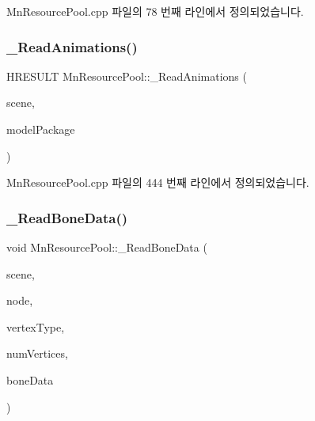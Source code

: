 Mn\+Resource\+Pool.\+cpp 파일의 78 번째 라인에서 정의되었습니다.

\mbox{\label{class_m_n_l_1_1_mn_resource_pool_a730bf312676520ba6b57f6d4a6dfdd6f}} 
\subsubsection{\texorpdfstring{\+\_\+\+Read\+Animations()}{\_ReadAnimations()}}
{\footnotesize\ttfamily H\+R\+E\+S\+U\+LT Mn\+Resource\+Pool\+::\+\_\+\+Read\+Animations (\begin{DoxyParamCaption}\item[{const ai\+Scene $\ast$}]{scene,  }\item[{\hyperlink{struct_m_n_l_1_1_mn_resource_pool_1_1___model_package}{\+\_\+\+Model\+Package} \&}]{model\+Package }\end{DoxyParamCaption})\hspace{0.3cm}{\ttfamily [private]}}



Mn\+Resource\+Pool.\+cpp 파일의 444 번째 라인에서 정의되었습니다.

\mbox{\label{class_m_n_l_1_1_mn_resource_pool_ad6968623dc167446598475230b369515}} 
\subsubsection{\texorpdfstring{\+\_\+\+Read\+Bone\+Data()}{\_ReadBoneData()}}
{\footnotesize\ttfamily void Mn\+Resource\+Pool\+::\+\_\+\+Read\+Bone\+Data (\begin{DoxyParamCaption}\item[{const ai\+Scene $\ast$}]{scene,  }\item[{const ai\+Node $\ast$}]{node,  }\item[{std\+::shared\+\_\+ptr$<$ \hyperlink{class_m_n_l_1_1_mn_custom_vertex_type}{Mn\+Custom\+Vertex\+Type} $>$}]{vertex\+Type,  }\item[{U\+I\+NT}]{num\+Vertices,  }\item[{std\+::vector$<$ \hyperlink{struct_m_n_l_1_1_mn_resource_pool_1_1___bone_data}{\+\_\+\+Bone\+Data} $>$ \&}]{bone\+Data }\end{DoxyParamCaption})\hspace{0.3cm}{\ttfamily [private]}}



